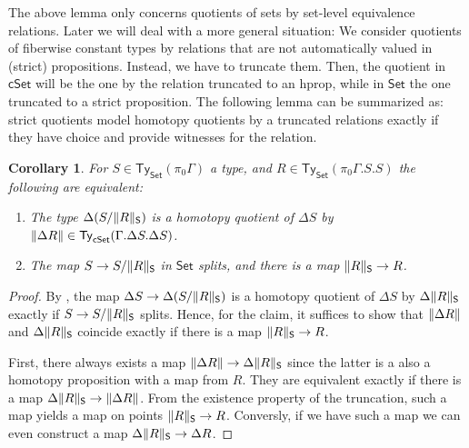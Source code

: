 \documentclass[10pt,a4paper]{article}
\newtheorem{corollary}{Corollary}[section]
\newcommand{\Set}{\mathsf{Set}}
\newcommand{\cSet}{\mathsf{cSet}}
\newcommand\Ty{\mathsf{Ty}}
\begin{document}
The above lemma only concerns quotients of sets by set-level equivalence relations.
Later we will deal with a more general situation: We consider quotients of fiberwise constant types by relations that are not automatically valued in (strict) propositions.
Instead, we have to truncate them.
Then, the quotient in \(\cSet\) will be the one by the relation truncated to an hprop, while in \(\Set\) the one truncated to a strict proposition.
The following lemma can be summarized as: strict quotients model homotopy quotients by a truncated relations exactly if they have choice and provide witnesses for the relation.

\begin{corollary}\label{prop:set-relevant-quotient-is-homotopy-quotient-iff-surjection-splits-and-witnesses-exist}
  For \(S \in \Ty_{\Set}(\pi_0\Gamma)\) a type, and \(R \in \Ty_{\Set}(\pi_0\Gamma.S.S)\) the following are equivalent:
  \begin{enumerate}[label=(\arabic*)]
    \item The type \(\Delta(S/\trunc*{R})\) is a homotopy quotient of \(\Delta S\) by \(\trunc{\Delta R} \in \Ty_{\cSet}(\Gamma.\Delta S. \Delta S)\).
    \item The map \(S \to S/\trunc*{R}\) in \(\Set\) splits, and there is a map \(\trunc*{R} \to R\).
  \end{enumerate}
\end{corollary}
\begin{proof}
  By , the map \(\Delta S \to \Delta(S/\trunc*{R})\) is a homotopy quotient of \(\Delta S\) by \(\Delta\trunc*{R}\) exactly if \(S \to S/\trunc*{R}\) splits.
  Hence, for the claim, it suffices to show that \(\trunc{\Delta R}\) and \(\Delta\trunc*{R}\) coincide exactly if there is a map \(\trunc*{R} \to R\).
  
  First, there always exists a map \(\trunc{\Delta R} \to \Delta\trunc*{R}\) since the latter is a also a homotopy proposition with a map from \(R\).
  They are equivalent exactly if there is a map \(\Delta\trunc*{R} \to \trunc{\Delta R}\).
  From the existence property of the truncation, such a map yields a map on points \(\trunc*{R} \to R\).
  Conversly, if we have such a map we can even construct a map \(\Delta\trunc*{R} \to \Delta R\).
\end{proof}
\end{document}
